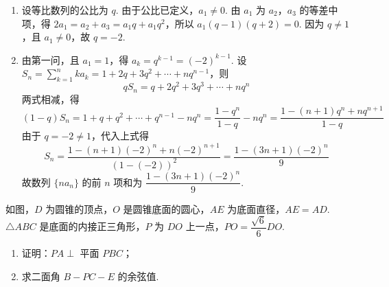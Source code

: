 \begin{solution}
\begin{enumerate}
\item 设等比数列的公比为 \(q\). 由于公比已定义，\(a_1\ne0\). 由 \(a_1\) 为 \(a_2\)，\(a_3\) 的等差中项，得 \(2a_1=a_2+a_3=a_1q+a_1q^2\)，所以 \(a_1(q-1)(q+2)=0\). 因为 \(q\ne1\)，且 \(a_1\ne0\)，故 \(q=-2\).

\item 由第一问，且 \(a_1=1\)，得 \(a_k=q^{k-1}=(-2)^{k-1}\). 设
\(S_n=\sum_{k=1}^nka_k=1+2q+3q^2+\cdots+nq^{n-1}\)，则
\[
qS_n=q+2q^2+3q^3+\cdots+nq^n
\]
两式相减，得
\[
(1-q)S_n=1+q+q^2+\cdots+q^{n-1}-nq^n
  =\frac{1-q^n}{1-q}-nq^n
  =\frac{1-(n+1)q^n+nq^{n+1}}{1-q}
\]
由于 \(q=-2\ne1\)，代入上式得
\[
S_n=\frac{1-(n+1)(-2)^n+n(-2)^{n+1}}{(1-(-2))^2}=\frac{1-(3n+1)(-2)^n}{9}
\]
故数列 \(\{na_n\}\) 的前 \(n\) 项和为 \(\dfrac{1-(3n+1)(-2)^n}{9}\).
\end{enumerate}
\end{solution}

\begin{problem}
如图，\(D\) 为圆锥的顶点，\(O\) 是圆锥底面的圆心，\(AE\) 为底面直径，\(AE=AD\). \(\triangle ABC\) 是底面的内接正三角形，\(P\) 为 \(DO\) 上一点，\(PO=\dfrac{\sqrt{6}}{6}DO\).

\begin{enumerate}
\item 证明：\(PA\perp\) 平面 \(PBC\)；

\item 求二面角 \(B-PC-E\) 的余弦值.
\end{enumerate}

\end{problem}

